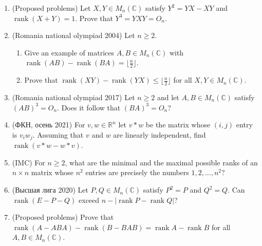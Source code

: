 \documentclass[11pt,a4paper]{article}
\DeclareMathOperator{\rank}{rank}
\begin{document}
\begin{enumerate}[leftmargin=2.2em,itemsep=0.6em]
\item (Proposed problems) Let $X,Y\in M_n(\mathbb C)$ satisfy $Y^2=YX-XY$ and
$\rank(X+Y)=1$. Prove that $Y^3=YXY=O_n$.

\item (Romania national olympiad 2004) Let $n\ge2$.
\begin{enumerate}[label=\alph*)]
\item Give an example of matrices $A,B\in M_n(\mathbb C)$ with
$\rank(AB)-\rank(BA)=\bigl\lfloor\frac n2\bigr\rfloor$.
\item Prove that $\rank(XY)-\rank(YX)\le\bigl\lfloor\frac n2\bigr\rfloor$ for all
$X,Y\in M_n(\mathbb C)$.
\end{enumerate}

\item (Romania national olympiad 2017) Let $n\ge2$ and let $A,B\in M_n(\mathbb C)$ satisfy
$(AB)^3=O_n$. Does it follow that $(BA)^3=O_n$?

\item (ФКН, осень 2021) For $v,w\in\mathbb R^n$ let $v*w$ be the matrix whose $(i,j)$ entry is
$v_iw_j$. Assuming that $v$ and $w$ are linearly independent, find $\rank(v*w-w*v)$.

\item (IMC) For $n\ge2$, what are the minimal and the maximal possible ranks of an $n\times n$
matrix whose $n^2$ entries are precisely the numbers $1,2,\dots,n^2$?

\item (Высшая лига 2020) Let $P,Q\in M_n(\mathbb C)$ satisfy $P^2=P$ and $Q^2=Q$. Can
$\rank(E-P-Q)$ exceed $n-|\rank P-\rank Q|$?

\item (Proposed problems) Prove that $\rank(A-ABA)-\rank(B-BAB)=\rank A-\rank B$ for all
$A,B\in M_n(\mathbb C)$.
\end{enumerate}
\end{document}

